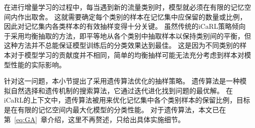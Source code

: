 



在进行增量学习的过程中，每当遇到新的流量类别时，模型就必须在有限的记忆空间内作出取舍。
这就需要确定每个类别的样本在记忆集中应保留的数量或比例，因此对记忆集内各类样本的有效抽样变得十分关键。
虽然传统的iCaRL策略倾向于采用均衡抽取的方法，即平等地从各个类别中抽取样本以保持类别间的平衡，但这种方法并不总能保证模型训练后的分类效果达到最佳。
这是因为不同类别的样本对于模型学习的贡献度并不相同，简单的均衡抽样可能无法充分考虑到样本对模型性能的实际影响。

针对这一问题，本小节提出了采用遗传算法优化的抽样策略。
遗传算法是一种模拟自然选择和遗传机制的搜索算法，它通过迭代进化找到问题的最优解。
在iCaRL的上下文中，遗传算法被用来优化记忆集中各个类别样本的保留比例，目标是在有限的记忆空间内最大化模型的分类性能。
对于遗传算法，本文已在第~\ref{eq:GA}~章介绍，这里不再赘述，只给出具体实施细节。\par

